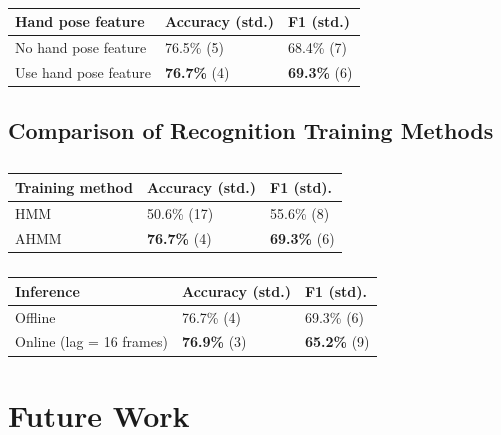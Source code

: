 \documentclass{sigchi}
\newcommand\tabhead[1]{\small\textbf{#1}}
\begin{document}
\begin{table}
\centering
\begin{tabular}{|l|l|l|}
\hline
\tabhead{Hand pose feature} & {\tabhead{Accuracy (std.)}} & {\tabhead{F1 (std.)}}\\
\hline
No hand pose feature & 76.5\% (5) & 68.4\% (7)\\
\hline
Use hand pose feature  & \textbf{76.7\%} (4) & \textbf{69.3\%} (6) \\
\hline
\end{tabular}
\caption{}
\end{table}

\subsection{Comparison of Recognition Training Methods}

\begin{table}[t]
\centering
\begin{tabular}{|l|l|l|}
\hline
\tabhead{Training method} & {\tabhead{Accuracy (std.)}} & {\tabhead{F1 (std).}}\\
\hline
HMM & 50.6\% (17) & 55.6\% (8) \\
\hline
AHMM & \textbf{76.7\%} (4) & \textbf{69.3\%} (6) \\
\hline
\end{tabular}
\caption{}
\end{table}

\begin{table}[t]
\centering
\begin{tabular}{|l|l|l|}
\hline
\tabhead{Inference} & {\tabhead{Accuracy (std.)}} & {\tabhead{F1 (std).}}\\
\hline
Offline & 76.7\% (4) & 69.3\% (6) \\
\hline
Online (lag = 16 frames) & \textbf{76.9\%} (3) & \textbf{65.2\%} (9) \\ 
\hline
\end{tabular}
\caption{}
\end{table}


\section{Future Work}
\end{document}
